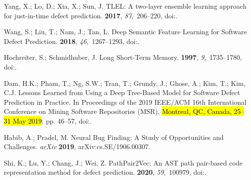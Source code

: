 \documentclass[mathematics,review,accept,moreauthors,pdftex]{Definitions/mdpi}
\begin{document}
\begin{thebibliography}{999}
Yang, X.; Lo, D.; Xia, X.; Sun, J.
\newblock TLEL: A two-layer ensemble learning approach for just-in-time defect
  prediction.
 {\bf 2017}, {\em
  87},~206--220,
\newblock
  doi:{\href{https://doi.org/https://doi.org/10.1016/j.infsof.2017.03.007}{}}.

{Wang}, S.; {Liu}, T.; {Nam}, J.; {Tan}, L.
\newblock Deep Semantic Feature Learning for Software Defect Prediction.
 {\bf 2018}, {\em
  46},~1267--1293,
\newblock
  doi:{\href{https://doi.org/10.1109/TSE.2018.2877612}{}}.

Hochreiter, S.; Schmidhuber, J.
\newblock Long Short-Term Memory.
 {\bf 1997}, {\em 9},~1735–1780,
\newblock
  doi:{\href{https://doi.org/10.1162/neco.1997.9.8.1735}{}}.

{Dam}, H.K.; {Pham}, T.; {Ng}, S.W.; {Tran}, T.; {Grundy}, J.; {Ghose}, A.;
  {Kim}, T.; {Kim}, C.J.
\newblock Lessons Learned from Using a Deep Tree-Based Model for Software
  Defect Prediction in Practice.
\newblock  In Proceedings of the 2019 IEEE/ACM 16th International Conference on Mining Software
  Repositories (MSR),  \hl{Montreal, QC, Canada, 25--31 May 2019}; pp. 46--57,
\newblock
  doi:{\href{https://doi.org/10.1109/MSR.2019.00017}{}}.

Habib, A.; Pradel, M.
\newblock Neural Bug Finding: A Study of Opportunities and Challenges. \emph{arXiv} \textbf{2019}, arXiv:cs.SE/1906.00307.

Shi, K.; Lu, Y.; Chang, J.; Wei, Z.
\newblock PathPair2Vec: An AST path pair-based code representation method for
  defect prediction.
 {\bf 2020}, {\em 59},~100979,
\newblock
  doi:{\href{https://doi.org/https://doi.org/10.1016/j.cola.2020.100979}{}}.


\end{thebibliography}
\end{document}
